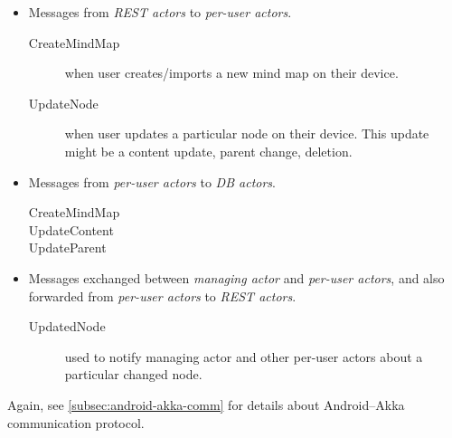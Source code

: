 \begin{itemize}
	\item Messages from \emph{REST actors} to \emph{per-user actors}.
	\begin{description}
		\item[CreateMindMap]{when user creates/imports a new mind map on their device.}
		\item[UpdateNode]{when user updates a particular node on their device. This update might be a content update, parent change, deletion.}
	\end{description}

	\item Messages from \emph{per-user actors} to \emph{DB actors}.
	\begin{description}
		\item[CreateMindMap]{}
		\item[UpdateContent]{}
		\item[UpdateParent]{}
	\end{description}

	\item Messages exchanged between \emph{managing actor} and \emph{per-user actors}, and also forwarded from \emph{per-user actors} to \emph{REST actors}.
	\begin{description}
		\item[UpdatedNode]{used to notify managing actor and other per-user actors about a particular changed node.}
	\end{description}
\end{itemize}

Again, see \cref{subsec:android-akka-comm} for details about Android--Akka communication protocol.
